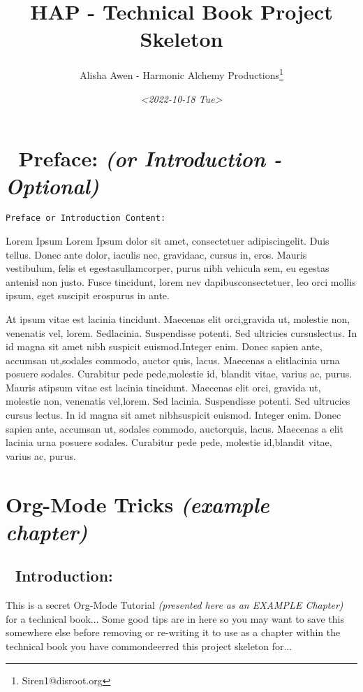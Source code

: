 \documentclass[openleft,oneside,showtrims]{memoir}
\author{Alisha Awen - Harmonic Alchemy Productions\thanks{Siren1@disroot.org}}
\date{\textit{<2022-10-18 Tue>}}
\title{HAP - Technical Book Project Skeleton}
\begin{document}
\maketitle
\setcounter{tocdepth}{3}
\tableofcontents

\chapter{📃 Preface: \emph{(or Introduction - Optional)}}
\label{sec:orgb5c2b3d}
\label{BOOK_PREFACE}
\texttt{Preface or Introduction Content:} 

Lorem Ipsum Lorem Ipsum dolor sit amet, consectetuer adipiscingelit. Duis tellus. Donec ante dolor, iaculis nec, gravidaac, cursus in, eros. Mauris vestibulum, felis et egestasullamcorper, purus nibh vehicula sem, eu egestas antenisl non justo. Fusce tincidunt, lorem nev dapibusconsectetuer, leo orci mollis ipsum, eget suscipit erospurus in ante.

At ipsum vitae est lacinia tincidunt. Maecenas elit orci,gravida ut, molestie non, venenatis vel, lorem. Sedlacinia. Suspendisse potenti. Sed ultricies cursuslectus. In id magna sit amet nibh suspicit euismod.Integer enim. Donec sapien ante, accumsan ut,sodales commodo, auctor quis, lacus. Maecenas a elitlacinia urna posuere sodales. Curabitur pede pede,molestie id, blandit vitae, varius ac, purus. Mauris atipsum vitae est lacinia tincidunt. Maecenas elit orci, gravida ut, molestie non, venenatis vel,lorem. Sed lacinia. Suspendisse potenti. Sed ultrucies cursus lectus. In id magna sit amet nibhsuspicit euismod. Integer enim. Donec sapien ante, accumsan ut, sodales commodo, auctorquis, lacus. Maecenas a elit lacinia urna posuere sodales. Curabitur pede pede, molestie id,blandit vitae, varius ac, purus.



\mainmatter

\chapter{Org-Mode Tricks \emph{(example chapter)}}
\label{sec:org2a74a4a}
\label{CHAPTER_org-mode-tricks}
\section{📄 Introduction:}
\label{sec:orga69708b}
\label{TOPIC_org-mode-tricks-introduction}
This is a secret Org-Mode Tutorial \emph{(presented here as an EXAMPLE Chapter)} for a technical book...  Some good tips are in here so you may want to save this somewhere else before removing or re-writing it to use as a chapter within the technical book you have commondeerred this project skeleton for...
\end{document}
